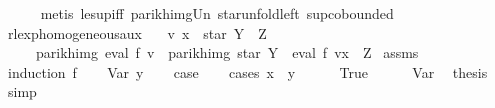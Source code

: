 \begin{isabellebody}
\ \ \ \ \isamarkupfalse%
\ {\isacharparenleft}{\kern0pt}metis\ le{\isacharunderscore}{\kern0pt}sup{\isacharunderscore}{\kern0pt}iff\ parikh{\isacharunderscore}{\kern0pt}img{\isacharunderscore}{\kern0pt}Un\ star{\isacharunderscore}{\kern0pt}unfold{\isacharunderscore}{\kern0pt}left\ sup{\isachardot}{\kern0pt}cobounded{}{\isacharparenright}{\kern0pt}\isanewline
{}\isamarkupfalse%
%
\endisatagproof
{\isafoldproof}%
%
\isadelimproof
%
\endisadelimproof
%
\isadelimdocument
%
\endisadelimdocument
%
\isatagdocument
%
\isamarkuptrue%
%
\endisatagdocument
{\isafolddocument}%
%
\isadelimdocument
%
\endisadelimdocument
{}\isamarkupfalse%
\ rlexp{\isacharunderscore}{\kern0pt}homogeneous{\isacharunderscore}{\kern0pt}aux{\isacharcolon}{\kern0pt}\isanewline
\ \ \ {\isachardoublequoteopen}v\ x\ {\isacharequal}{\kern0pt}\ star\ Y\ {\isacharat}{\kern0pt}{\isacharat}{\kern0pt}\ Z{\isachardoublequoteclose}\isanewline
\ \ \ \ \ {\isachardoublequoteopen}parikh{\isacharunderscore}{\kern0pt}img\ {\isacharparenleft}{\kern0pt}eval\ f\ v{\isacharparenright}{\kern0pt}\ {\isasymsubseteq}\ parikh{\isacharunderscore}{\kern0pt}img\ {\isacharparenleft}{\kern0pt}star\ Y\ {\isacharat}{\kern0pt}{\isacharat}{\kern0pt}\ eval\ f\ {\isacharparenleft}{\kern0pt}v{\isacharparenleft}{\kern0pt}x\ {\isacharcolon}{\kern0pt}{\isacharequal}{\kern0pt}\ Z{\isacharparenright}{\kern0pt}{\isacharparenright}{\kern0pt}{\isacharparenright}{\kern0pt}{\isachardoublequoteclose}\isanewline
%
\isadelimproof
%
\endisadelimproof
%
\isatagproof
{}\isamarkupfalse%
\ assms\ \isamarkupfalse%
\ {\isacharparenleft}{\kern0pt}induction\ f{\isacharparenright}{\kern0pt}\isanewline
\ \ \isamarkupfalse%
\ {\isacharparenleft}{\kern0pt}Var\ y{\isacharparenright}{\kern0pt}\isanewline
\ \ \isamarkupfalse%
\ {\isacharquery}{\kern0pt}case\isanewline
\ \ \isamarkupfalse%
\ {\isacharparenleft}{\kern0pt}cases\ {\isachardoublequoteopen}x\ {\isacharequal}{\kern0pt}\ y{\isachardoublequoteclose}{\isacharparenright}{\kern0pt}\isanewline
\ \ \ \ \isamarkupfalse%
\ True\isanewline
\ \ \ \ \isamarkupfalse%
\ Var\ \isamarkupfalse%
\ {\isacharquery}{\kern0pt}thesis\ \isamarkupfalse%
\ simp\isanewline
\ \ \isamarkupfalse%
\isanewline
\ \ \ \ \isamarkupfalse%

\end{isabellebody}
